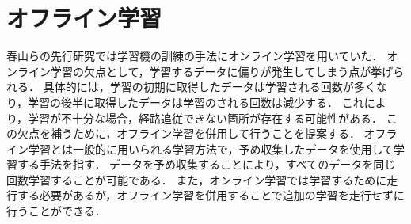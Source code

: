 \newpage
\section{オフライン学習}
春山らの先行研究では学習機の訓練の手法にオンライン学習を用いていた．
オンライン学習の欠点として，学習するデータに偏りが発生してしまう点が挙げられる．
具体的には，学習の初期に取得したデータは学習される回数が多くなり，学習の後半に取得したデータは学習のされる回数は減少する．
これにより，学習が不十分な場合，経路追従できない箇所が存在する可能性がある．
この欠点を補うために，オフライン学習を併用して行うことを提案する．
オフライン学習とは一般的に用いられる学習方法で，予め収集したデータを使用して学習する手法を指す．
データを予め収集することにより，すべてのデータを同じ回数学習することが可能である．
また，オンライン学習では学習するために走行する必要があるが，オフライン学習を併用することで追加の学習を走行せずに行うことができる．